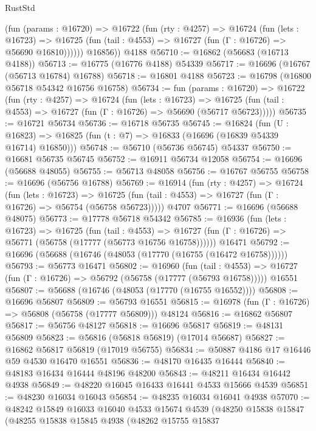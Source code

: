 \begin{lexlean}{RustStd}
\begin{coremodule}
          (fun (params : @16720) =>
          @16722
            (fun (rty : @4257) =>
            @16724
              (fun (lets : @16723) =>
              @16725 (fun (tail : @4553) => @16727 (fun (Γ : @16726) => @56690 @16810))))))
        @16856))
    @4188
@56710 := @16862 (@56683 (@16713 @4188))
@56713 := @16775 (@16776 @4188) @54339
@56717 := @16696 (@16767 (@56713 @16784) @16788)
@56718 := @16801 @4188
@56723 := @16798 (@16800 @56718 @54342 @16756 @16758)
@56734 := fun (params : @16720) =>
  @16722
    (fun (rty : @4257) =>
    @16724
      (fun (lets : @16723) =>
      @16725 (fun (tail : @4553) => @16727 (fun (Γ : @16726) => @56690 (@56717 @56723)))))
@56735 := @16721 @56734
@56736 := @16718 @56735
@56745 := @16824
    (fun (U : @16823) => @16825 (fun (t : @7) => @16833 (@16696 (@16839 @54339 @16714) @16850)))
@56748 := @56710 (@56736 @56745) @54337
@56750 := @16681 @56735 @56745
@56752 := @16911 @56734 @12058
@56754 := @16696 (@56688 @48055)
@56755 := @56713 @48058
@56756 := @16767 @56755
@56758 := @16696 (@56756 @16788)
@56769 := @16914
    (fun (rty : @4257) =>
    @16724
      (fun (lets : @16723) =>
      @16725 (fun (tail : @4553) => @16727 (fun (Γ : @16726) => @56754 (@56758 @56723)))))
    @4707
@56771 := @16696 (@56688 @48075)
@56773 := @17778 @56718 @54342
@56785 := @16936
    (fun (lets : @16723) =>
    @16725
      (fun (tail : @4553) =>
      @16727 (fun (Γ : @16726) => @56771 (@56758 (@17777 (@56773 @16756 @16758))))))
    @16471
@56792 := @16696 (@56688 (@16746 (@48053 (@17770 (@16755 (@16472 @16758))))))
@56793 := @56773 @16471
@56802 := @16960
    (fun (tail : @4553) => @16727 (fun (Γ : @16726) => @56792 (@56758 (@17777 (@56793 @16758)))))
    @16551
@56807 := @56688 (@16746 (@48053 (@17770 (@16755 @16552))))
@56808 := @16696 @56807
@56809 := @56793 @16551
@56815 := @16978 (fun (Γ : @16726) => @56808 (@56758 (@17777 @56809))) @48124
@56816 := @16862 @56807
@56817 := @56756 @48127
@56818 := @16696 @56817
@56819 := @48131 @56809
@56823 := @56816 (@56818 @56819) (@17014 @56687)
@56827 := @16862 @56817 @56819 (@17019 @56755)
@56834 := @50887 @4186 @17 @16446 @59 @4530 @16470 @16551
@56836 := @48170 @16435 @16444
@56840 := @48183 @16434 @16444 @48196 @48200
@56843 := @48211 @16434 @16442 @4938
@56849 := @48220 @16045 @16433 @16441 @4533 @15666 @4539
@56851 := @48230 @16034 @16043
@56854 := @48235 @16034 @16041 @4938
@57070 := @48242
    @15849
    @16033
    @16040
    @4533
    @15674
    @4539
    (@48250
      @15838
      @15847
      (@48255
        @15838
        @15845
        @4938
        (@48262
          @15755
          @15837

\end{coremodule}
\end{lexlean}
